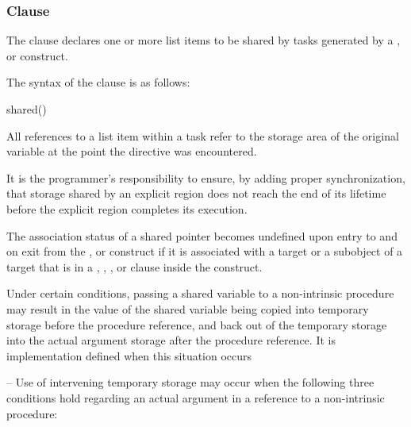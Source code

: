 \subsubsection{ Clause}
\label{subsubsec:shared clause}
\summary
The  clause declares one or more list items to be shared by tasks generated by 
a ,  or  construct. 

\syntax
The syntax of the  clause is as follows:

\begin{boxedcode}
shared()
\end{boxedcode}

\descr
All references to a list item within a task refer to the storage area of the original variable 
at the point the directive was encountered. 

It is the programmer's responsibility to ensure, by adding proper synchronization, that 
storage shared by an explicit  region does not reach the end of its lifetime before 
the explicit  region completes its execution. 

\fortranspecificstart
The association status of a shared pointer becomes undefined upon entry to and on exit 
from the ,  or  construct if it is associated with a target or a 
subobject of a target that is in a , , , or 
 clause inside the construct.

Under certain conditions, passing a shared variable to a non-intrinsic procedure may 
result in the value of the shared variable being copied into temporary storage before the 
procedure reference, and back out of the temporary storage into the actual argument 
storage after the procedure reference. It is implementation defined when this situation 
occurs

\notestart
\noteheader – Use of intervening temporary storage may occur when the following three 
conditions hold regarding an actual argument in a reference to a non-intrinsic procedure:

